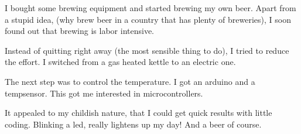 \documentclass[letterpaper,10pt,english]{sphinxmanual}
\begin{document}
I bought some brewing equipment and started brewing my own beer.
Apart from a stupid idea, (why brew beer in a country that has plenty of breweries), I soon found out that brewing is labor intensive.

Instead of quitting right away (the most sensible thing to do), I tried to reduce the effort.
I switched from a gas heated kettle to an electric one.

The next step was to control the temperature.
I got an arduino and a temp\sphinxhyphen{}sensor.
This got me interested in microcontrollers.

It appealed to my childish nature, that I could get quick results with little coding.
Blinking a led, really lightens up my day!
And a beer of course.

\begin{sphinxVerbatim}[commandchars=\\\{\}]
              
\end{sphinxVerbatim}



\renewcommand{\indexname}{Index}
\printindex
\end{document}
